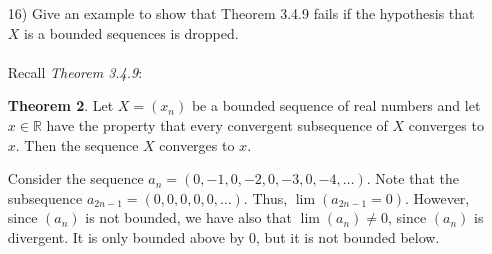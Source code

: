 \documentclass[12pt,letterpaper]{article}
\newcommand{\R}{\mathbb{R}}
\theoremstyle{case}
\theoremstyle{definition}
\newtheorem*{theorem*}{Theorem}
\begin{document}
\begin{enumerate}
\begin{enumerate}
\begin{theorem*}
\begin{enumerate}
				\item $X$ is unbounded
			\end{enumerate}
		\end{theorem*}
		Thus by the \textit{Divergence Criteria}, we have that since $(z_n)$ and $(w_n)$ satisfy the first property of the \textit{Divergence Criteria}, we can conclude that the sequence $(x_n)$ is divergent. \\
		
		\item[16)] Give an example to show that Theorem 3.4.9 fails if the hypothesis that $X$ is a bounded sequences is dropped.
		\\\\Recall \textit{Theorem 3.4.9}:
		\begin{theorem*}
			Let $X=(x_n)$ be a bounded sequence of real numbers and let $x \in \R$ have the property that every convergent subsequence of $X$ converges to $x$. Then the sequence $X$ converges to $x$.
		\end{theorem*}
		Consider the sequence $a_n=(0,-1,0,-2,0,-3,0,-4, \dots)$. Note that the subsequence $a_{2n-1}=(0,0,0,0,0,\dots)$. Thus, $\lim (a_{2n-1}=0)$. However, since $(a_n)$ is not bounded, we have also that $\lim (a_n) \neq 0$, since $(a_n)$ is divergent. It is only bounded above by $0$, but it is not bounded below.
		

\end{enumerate}
\end{enumerate}
\end{document}
